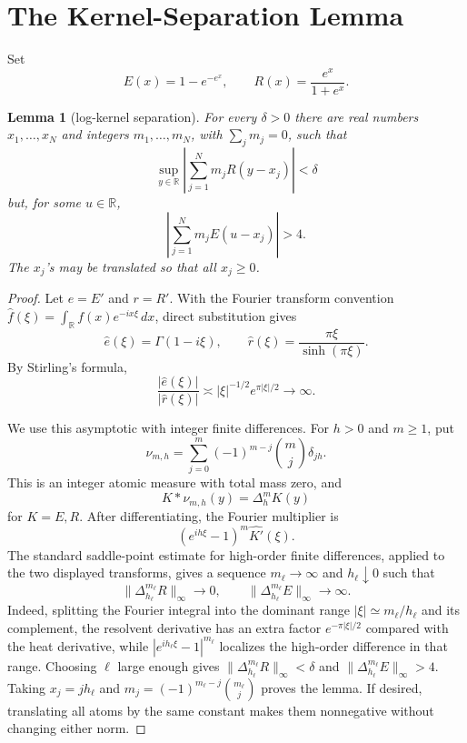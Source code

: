 \documentclass[11pt]{article}
\newtheorem{lemma}{Lemma}
\begin{document}
\section*{The Kernel-Separation Lemma}

Set
\[
  E(x)=1-e^{-e^x},\qquad R(x)=\frac{e^x}{1+e^x}.
\]

\begin{lemma}[log-kernel separation]\label{lem:separation}
For every \(\delta>0\) there are real numbers \(x_1,\dots,x_N\) and integers
\(m_1,\dots,m_N\), with \(\sum_jm_j=0\), such that
\[
  \sup_{y\in\mathbb R}\left|\sum_{j=1}^N m_jR(y-x_j)\right|<\delta
\]
but, for some \(u\in\mathbb R\),
\[
  \left|\sum_{j=1}^Nm_jE(u-x_j)\right|>4.
\]
The \(x_j\)'s may be translated so that all \(x_j\geq0\).
\end{lemma}

\begin{proof}
Let \(e=E'\) and \(r=R'\).  With the Fourier transform convention
\(\widehat f(\xi)=\int_{\mathbb R}f(x)e^{-ix\xi}\,dx\), direct substitution gives
\[
  \widehat e(\xi)=\Gamma(1-i\xi),\qquad
  \widehat r(\xi)=\frac{\pi\xi}{\sinh(\pi\xi)} .
\]
By Stirling's formula,
\[
  \frac{|\widehat e(\xi)|}{|\widehat r(\xi)|}
    \asymp |\xi|^{-1/2}e^{\pi|\xi|/2}\to\infty .
\]

We use this asymptotic with integer finite differences.  For \(h>0\) and
\(m\geq1\), put
\[
  \nu_{m,h}=\sum_{j=0}^m(-1)^{m-j}\binom{m}{j}\delta_{jh}.
\]
This is an integer atomic measure with total mass zero, and
\[
  K*\nu_{m,h}(y)=\Delta_h^mK(y)
\]
for \(K=E,R\).  After differentiating, the Fourier multiplier is
\[
  (e^{ih\xi}-1)^m\widehat{K'}(\xi).
\]
The standard saddle-point estimate for high-order finite differences, applied
to the two displayed transforms, gives a sequence \(m_\ell\to\infty\) and
\(h_\ell\downarrow0\) such that
\[
  \|\Delta_{h_\ell}^{m_\ell}R\|_\infty\to0,\qquad
  \|\Delta_{h_\ell}^{m_\ell}E\|_\infty\to\infty .
\]
Indeed, splitting the Fourier integral into the dominant range
\(|\xi|\simeq m_\ell/h_\ell\) and its complement, the resolvent derivative has an
extra factor \(e^{-\pi|\xi|/2}\) compared with the heat derivative, while
\(|e^{ih_\ell\xi}-1|^{m_\ell}\) localizes the high-order difference in that
range.  Choosing \(\ell\) large enough gives
\(\|\Delta_{h_\ell}^{m_\ell}R\|_\infty<\delta\) and
\(\|\Delta_{h_\ell}^{m_\ell}E\|_\infty>4\).  Taking
\(x_j=jh_\ell\) and \(m_j=(-1)^{m_\ell-j}\binom{m_\ell}{j}\) proves the lemma.
If desired, translating all atoms by the same constant makes them nonnegative
without changing either norm.
\end{proof}
\end{document}
